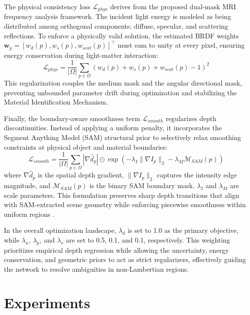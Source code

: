 \documentclass[lettersize,journal]{IEEEtran}
\begin{document}
The physical consistency loss $\mathcal{L}_{phys}$ derives from the proposed dual-mask MRI frequency analysis framework. The incident light energy is modeled as being distributed among orthogonal components: diffuse, specular, and scattering reflections. To enforce a physically valid solution, the estimated BRDF weights $\mathbf{w}_p = [w_d(p), w_s(p), w_{scat}(p)]^\top$ must sum to unity at every pixel, ensuring energy conservation during light-matter interaction:
\begin{equation}
\mathcal{L}_{phys} = \frac{1}{|\Omega|} \sum_{p \in \Omega} \left( w_d(p) + w_s(p) + w_{scat}(p) - 1 \right)^2
\end{equation}
This regularization couples the medium mask and the angular directional mask, preventing unbounded parameter drift during optimization and stabilizing the Material Identification Mechanism.

Finally, the boundary-aware smoothness term $\mathcal{L}_{smooth}$ regularizes depth discontinuities. Instead of applying a uniform penalty, it incorporates the Segment Anything Model (SAM) \cite{kirillov2023} structural prior to selectively relax smoothing constraints at physical object and material boundaries:
\begin{equation}
\mathcal{L}_{smooth} = \frac{1}{|\Omega|} \sum_{p \in \Omega} |\nabla \hat{d}_p| \odot \exp\left(-\lambda_I \|\nabla I_p\|_2 - \lambda_M \mathcal{M}_{SAM}(p)\right)
\end{equation}
where $\nabla \hat{d}_p$ is the spatial depth gradient, $\|\nabla I_p\|_2$ captures the intensity edge magnitude, and $\mathcal{M}_{SAM}(p)$ is the binary SAM boundary mask. $\lambda_I$ and $\lambda_M$ are scale parameters. This formulation preserves sharp depth transitions that align with SAM-extracted scene geometry while enforcing piecewise smoothness within uniform regions \cite{wang2015}. 

In the overall optimization landscape, $\lambda_{d}$ is set to 1.0 as the primary objective, while $\lambda_{u}$, $\lambda_{p}$, and $\lambda_{s}$ are set to 0.5, 0.1, and 0.1, respectively. This weighting prioritizes empirical depth regression while allowing the uncertainty, energy conservation, and geometric priors to act as strict regularizers, effectively guiding the network to resolve ambiguities in non-Lambertian regions.

\section{Experiments}
\end{document}
